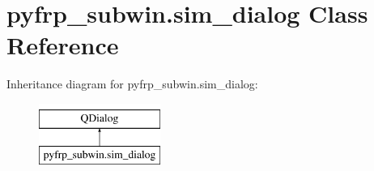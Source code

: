\hypertarget{classpyfrp__subwin_1_1sim__dialog}{\section{pyfrp\+\_\+subwin.\+sim\+\_\+dialog Class Reference}
\label{classpyfrp__subwin_1_1sim__dialog}
}
Inheritance diagram for pyfrp\+\_\+subwin.\+sim\+\_\+dialog\+:\begin{figure}[H]
\begin{center}
\leavevmode
\includegraphics[height=2.000000cm]{classpyfrp__subwin_1_1sim__dialog}
\end{center}
\end{figure}
